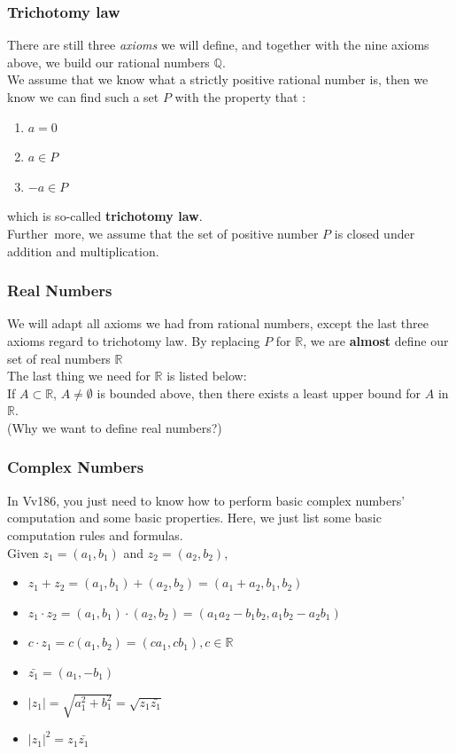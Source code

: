 \documentclass[12pt, t]{beamer}
\renewcommand{\emph}[1]{{\color{Turquoise3}\textsl{#1}}}
\begin{document}
\begin{frame}
    \frametitle{Trichotomy law}
    There are still three \emph{axioms} we will define, and together with the nine axioms above, 
we build our rational numbers $\mathbb{Q}$.\\
    \vspace{1em}    
    We assume that we know what a strictly positive rational number is, then we know we can find such 
    a set $P$ with the property that :
    \begin{enumerate}
        \item $a=0$
        \item $a\in P$
        \item $-a\in P$
    \end{enumerate}
which is so-called \textbf{trichotomy law}.\\
Further more, we assume that the set of positive number $P$ is closed under addition and multiplication.\\
\end{frame}


\begin{frame}
    \frametitle{Real Numbers}
We will adapt all axioms we had from rational numbers, except the last three axioms 
regard to trichotomy law. By replacing $P$ for $\mathbb{R}$, we are \textbf{almost}
define our set of real numbers $\mathbb{R}$\\
\vspace{1em}
The last thing we need for $\mathbb{R}$ is listed below:\\
\vspace{1em}
If $A\subset \mathbb{R}$, $A\neq \emptyset$ is bounded above, then there exists a least upper
bound for $A$ in $\mathbb{R}$.\\
\vspace{1em}
(Why we want to define real numbers?)
\end{frame}

\begin{frame}
    \frametitle{Complex Numbers}
    In Vv186, you just need to know how to perform basic complex numbers' computation and some basic properties.
    Here, we just list some basic computation rules and formulas.\\
    Given $z_1=(a_1,b_1)$ and $z_2=(a_2,b_2)$,
\begin{itemize}
    \item $z_1+z_2=(a_1,b_1)+(a_2,b_2)=(a_1+a_2,b_1,b_2)$
    \item $z_1\cdot z_2=(a_1,b_1)\cdot (a_2,b_2)=(a_1a_2-b_1b_2,a_1b_2-a_2b_1)$
    \item $c\cdot z_1=c(a_1,b_2)=(ca_1,cb_1), c\in \mathbb{R} $
    \item $\bar{z_1}=(a_1,-b_1)$
    \item $|z_1|=\sqrt{a_1^2+b_1^2}=\sqrt{z_1\bar{z_1}}$
    \item $|z_1|^2=z_1\bar{z_1}$
\end{itemize}
\end{frame}
\end{document}
